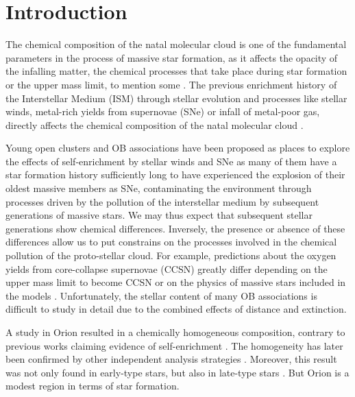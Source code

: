 \documentclass{aa} %
\begin{document}
   \maketitle
%

\section{Introduction}

The chemical composition of the natal molecular cloud is one of the fundamental parameters in the process of massive star formation, as it affects the opacity of the infalling matter, the chemical processes that take place during star formation or the upper mass limit, to mention some \citep[e.g.][]{zy07, tan14}. The previous enrichment history of the Interstellar Medium (ISM) through stellar evolution and processes like stellar winds, metal-rich yields from supernovae (SNe) or infall of metal-poor gas, directly affects the chemical composition of the natal molecular cloud \citep[e.g.][]{langer12, prantzos18, barrera18}. 

Young open clusters and OB associations have been proposed as places to explore the effects of self-enrichment by stellar winds and SNe \citep[e.g.][]{spina17, palla11, biazzo11a, ssimon10, cunha94, cunha92} as many of them have a star formation history sufficiently long to have experienced the explosion of their oldest massive members as SNe, contaminating the environment through processes driven by the pollution of the interstellar medium by subsequent generations of massive stars. We may thus expect that subsequent stellar generations show chemical differences. Inversely, the presence or absence of these differences allow us to put constrains on the processes involved in the chemical pollution of the proto-stellar cloud. For example, predictions about the oxygen yields from core-collapse supernovae (CCSN) greatly differ depending on the  upper mass limit to become CCSN or on the physics of massive stars included in the models \citep[see e.g.][and references therein]{suzuki18, prantzos18}.
  Unfortunately, the stellar content of many OB associations is difficult to study in detail due to the combined effects of distance and extinction.
  
A study in Orion \citep{ssimon10} resulted in a chemically homogeneous composition, contrary to previous works claiming evidence of self-enrichment \citep{cunha94}. The homogeneity has later been confirmed by other independent analysis strategies \citep[see][]{nieva11,cunha12}. Moreover, this result was not only found in early-type stars, but also in late-type stars \citep[e.g.][]{biazzo11a,biazzo11b}. But Orion is a modest region in terms of star formation. 
\end{document}
